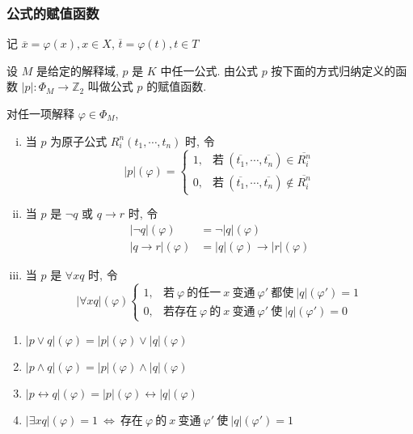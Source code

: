 \documentclass[
    color=black,
    device=normal,
    lang=cn
]{elegantnote}
\begin{document}
\subsubsection{公式的赋值函数}
记 $\overline{x}=\varphi(x), x\in X$, $\overline{t}=\varphi(t), t\in T$
\begin{definition}[公式的赋值函数]
    设 $M$ 是给定的解释域, $p$ 是 $K$ 中任一公式. 由公式 $p$ 按下面的方式归纳定义的函数 $\lvert p\rvert:\Phi_M\to\mathbb{Z}_2$ 叫做公式 $p$ 的赋值函数.

    对任一项解释 $\varphi\in\Phi_M$,
    \begin{enumerate}[(i)]
        \item 当 $p$ 为原子公式 $R_i^n(t_1, \cdots, t_n)$ 时, 令
              $$
                  \lvert p\rvert (\varphi)=
                  \begin{cases}
                      1, & \text{若}\ (\overline{t_1}, \cdots, \overline{t_n})\in \overline{R_i^n}    \\
                      0, & \text{若}\ (\overline{t_1}, \cdots, \overline{t_n})\notin \overline{R_i^n}
                  \end{cases}
              $$
        \item 当 $p$ 是 $\lnot q$ 或 $q\to r$ 时, 令
              \begin{align*}
                  \lvert\lnot q\rvert(\varphi) & =\lnot\lvert q\rvert(\varphi)                       \\
                  \lvert q\to r\rvert(\varphi) & = \lvert q\rvert(\varphi)\to\lvert r\rvert(\varphi)
              \end{align*}
        \item 当 $p$ 是 $\forall xq$ 时, 令
              $$
                  \lvert\forall x q\rvert(\varphi)
                  \begin{cases}
                      1, & \text{若}\ \varphi\ \text{的任一}\ x\ \text{变通}\ \varphi'\ \text{都使}\ \lvert q\rvert(\varphi')=1 \\
                      0, & \text{若存在}\ \varphi\ \text{的}\ x\ \text{变通}\ \varphi'\ \text{使}\ \lvert q\rvert(\varphi')=0
                  \end{cases}
              $$
    \end{enumerate}
\end{definition}
\begin{proposition}
    \hfill
    \begin{enumerate}[label = $\arabic*^\circ$]
        \item $\lvert p\lor q\rvert (\varphi) = \lvert p\rvert (\varphi)\lor \lvert q\rvert (\varphi)$
        \item $\lvert p\land q\rvert (\varphi) = \lvert p\rvert (\varphi)\land \lvert q\rvert (\varphi)$
        \item $\lvert p\leftrightarrow q\rvert (\varphi) = \lvert p\rvert (\varphi)\leftrightarrow \lvert q\rvert (\varphi)$
        \item $\lvert \exists x q\rvert (\varphi) = 1\ \Leftrightarrow\  \text{存在}\ \varphi\ \text{的}\ x\ \text{变通}\ \varphi'\ \text{使}\ \lvert q\rvert(\varphi')=1$
    \end{enumerate}
\end{proposition}
\end{document}
